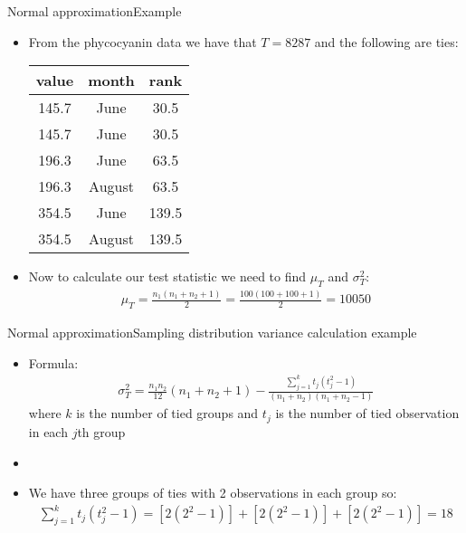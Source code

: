 \documentclass[xcolor=dvipsnames]{beamer}
\begin{document}
\begin{frame}{Normal approximation}{Example}
	\begin{itemize}
		\item From the phycocyanin data we have that $T = 8287$ and the following are ties:
		\begin{center}
			\begin{tabular}{|c|c|c|}
					\hline
				  \textbf{value} & \textbf{month}&  \textbf{rank} \\ \hline \hline
				 145.7  & June &  30.5\\ \hline
				 145.7  & June &  30.5\\ \hline
				 196.3  & June &  63.5\\ \hline
				 196.3 &August &  63.5\\ \hline
				 354.5 &  June & 139.5\\ \hline
				 354.5& August & 139.5\\ \hline
			\end{tabular}
		\end{center}
	\item Now to calculate our test statistic we need to find $\mu_T$ and $\sigma_T^2$:
	\begin{align*}
		\mu_T = \frac{n_1 (n_1 + n_2 + 1)}{2} = \frac{100(100+100+1)}{2} = 10050
	\end{align*}
	\end{itemize}
\end{frame}

\begin{frame}{Normal approximation}{Sampling distribution variance calculation example}
\begin{itemize}
	\item Formula: 	\begin{gather*}
	\sigma_T^{2} = \frac{n_1 n_2}{12}(n_1 +n_2 +1)- \frac{\sum_{j=1}^k t_j (t_j^2-1)}{(n_1+n_2)(n_1+n_2-1)}
	\end{gather*}
	where $k$ is the number of tied groups and $t_j$ is the number of tied observation in each $j$th group
	\item[]
	\item We have three groups of ties with 2 observations in each group so:
	\begin{gather*}
		\sum_{j=1}^k t_j (t_j^2-1) =  [2(2^2 -1)] + [2(2^2 -1)] + [2(2^2 -1)] = 18
	\end{gather*}
\end{itemize}
\end{frame}
\end{document}
